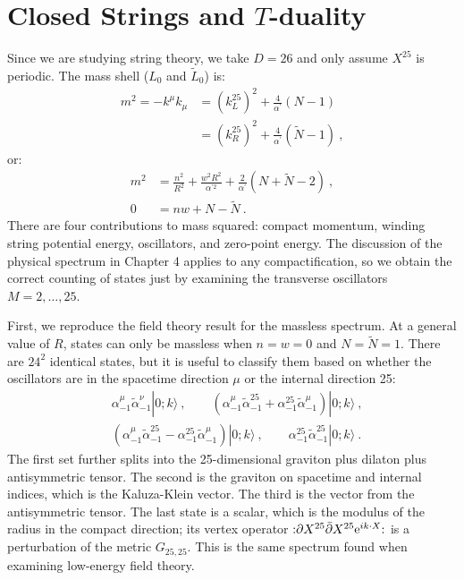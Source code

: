 \section{\texorpdfstring{Closed Strings and $T$-duality}{8.3 Closed Strings and $T$-duality}} \label{sec:8.3}

Since we are studying string theory, we take $D=26$ and only assume $X^{25}$ is periodic.
The mass shell ($L_{0}$ and $\tilde{L}_{0}$) is:
\begin{align}
	m^{2}=-k^{\mu} k_{\mu} &= (k_{L}^{25})^{2}+\frac{4}{\alpha^{\prime}}(N-1) \nonumber \\
	&=(k_{R}^{25})^{2}+\frac{4}{\alpha^{\prime}}(\tilde{N}-1) \:, \label{8.3.1}
\end{align}
or:
\begin{subequations} \label{8.3.2}
	\begin{align}
		m^{2} &= \frac{n^{2}}{R^{2}}+\frac{w^{2} R^{2}}{\alpha^{\prime 2}}+\frac{2}{\alpha^{\prime}}(N+\tilde{N}-2) \:, \label{8.3.2a} \\
		0 &= n w+N-\tilde{N} \:. \label{8.3.2b} 
	\end{align}
\end{subequations}
There are four contributions to mass squared: compact momentum, winding string potential energy, oscillators, and zero-point energy. The discussion of the physical spectrum in Chapter 4 applies to any compactification, 
so we obtain the correct counting of states just by examining the transverse oscillators $M=2, \ldots, 25$.

First, we reproduce the field theory result for the massless spectrum. At a general value of $R$, states can only be massless when $n=w=0$ and $N=\tilde{N}=1$.
There are $24^{2}$ identical states, but it is useful to classify them based on whether the oscillators are in the spacetime direction $\mu$ or the internal direction 25:
\begin{align}
	&\alpha_{-1}^{\mu} \tilde{\alpha}_{-1}^{\nu}|0 ; k\rangle\:, \qquad 
	(\alpha_{-1}^{\mu} \tilde{\alpha}_{-1}^{25}+\alpha_{-1}^{25} \tilde{\alpha}_{-1}^{\mu})|0 ; k\rangle \:, \nonumber \\
	&(\alpha_{-1}^{\mu} \tilde{\alpha}_{-1}^{25}-\alpha_{-1}^{25} \tilde{\alpha}_{-1}^{\mu})|0 ; k\rangle\:, \qquad 
	\alpha_{-1}^{25} \tilde{\alpha}_{-1}^{25}|0 ; k\rangle \:. \label{8.3.3}
\end{align}
The first set further splits into the 25-dimensional graviton plus dilaton plus antisymmetric tensor. The second is the graviton on spacetime and internal indices, which is the Kaluza-Klein vector. The third is the vector from the antisymmetric tensor.
The last state is a scalar, which is the modulus of the radius in the compact direction; its vertex operator $:\mathrel{\partial X^{25} \bar{\partial} X^{25} \mathrm{e}^{i k \cdot X}}:$ is a perturbation of the metric $G_{25,25}$. This is the same spectrum found when examining low-energy field theory.

